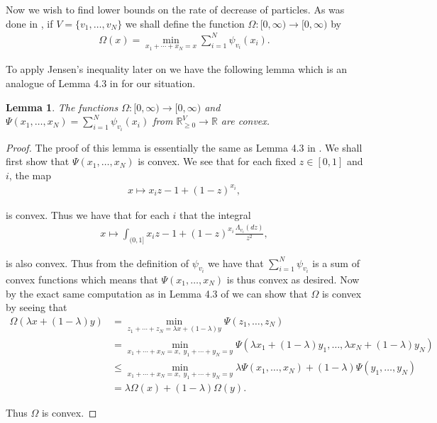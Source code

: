\documentclass[11pt]{article}
\newtheorem{lemma}{Lemma}
\theoremstyle{definition}
\newcommand{\R}{\mathbb{R}}
\begin{document}
\noindent Now we wish to find lower bounds on the rate of decrease of particles. As was done in \cite{Johnston2023}, if $V = \{v_1, \ldots, v_N\}$ we shall define the function $\Omega \colon [0,\infty) \to [0, \infty)$ by 
%
\begin{align*}
    \Omega(x) = \min_{x_1 + \cdots + x_N = x} \sum_{i = 1}^N \psi_{v_i}(x_i).
\end{align*}

\noindent To apply Jensen's inequality later on we have the following lemma which is an analogue of Lemma 4.3 in \cite{Johnston2023} for our situation.

\begin{lemma}\label{L:convex}
    The functions $\Omega\colon [0,\infty) \to [0, \infty)$ and $\Psi(x_1, \ldots, x_N) = \sum_{i = 1}^N \psi_{v_i}(x_i)$ from $\R_{\geq 0}^V \to \R$ are convex.
\end{lemma}

\begin{proof}
    The proof of this lemma is essentially the same as Lemma 4.3 in \cite{Johnston2023}. We shall first show that $\Psi(x_1, \ldots, x_N)$ is convex. We see that for each fixed $z \in [0,1]$ and $i$, the map
    \begin{align*}
        x \mapsto x_iz - 1 + (1-z)^{x_i},
    \end{align*}

    \noindent is convex. Thus we have that for each $i$ that the integral
    \begin{align*}
        x \mapsto \int_{(0,1]} x_iz - 1 + (1-z)^{x_i} \frac{\Lambda_{v_i}(dz)}{z^2},
    \end{align*}

    \noindent is also convex. Thus from the definition of $\psi_{v_i}$ we have that $\sum_{i = 1}^N \psi_{v_i}$ is a sum of convex functions which means that $\Psi(x_1, \ldots, x_N)$ is thus convex as desired. Now by the exact same computation as in Lemma 4.3 of \cite{Johnston2023} we can show that $\Omega$ is convex by seeing that
    \begin{align*}
        \Omega(\lambda x + (1-\lambda)y) &= \min_{z_1 + \cdots + z_N = \lambda x + (1-\lambda)y} \Psi(z_1, \ldots, z_N)\\
        &= \min_{x_1 + \cdots + x_N = x,\;y_1 + \cdots +y_N = y} \Psi(\lambda x_1 + (1-\lambda)y_1, \ldots, \lambda x_N + (1-\lambda)y_N)\\
        &\leq \min_{x_1 + \cdots + x_N = x,\;y_1 + \cdots +y_N = y} \lambda\Psi( x_1 , \ldots,x_N) + (1-\lambda)\Psi( y_1 , \ldots,y_N)\\
        &= \lambda \Omega(x) + (1-\lambda)\Omega(y).
    \end{align*}

    \noindent Thus $\Omega$ is convex.
\end{proof}
\end{document}
